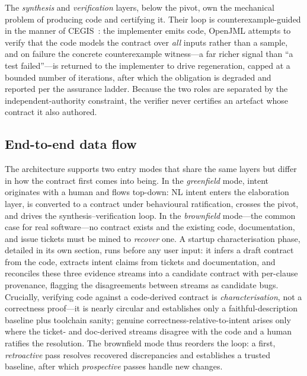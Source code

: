 The \emph{synthesis} and \emph{verification} layers, below the pivot, own the mechanical problem of producing code and certifying it. Their loop is counterexample-guided in the manner of CEGIS~\cite{solarlezama2008sketching}: the implementer emits code, OpenJML attempts to verify that the code models the contract over \emph{all} inputs rather than a sample, and on failure the concrete counterexample witness---a far richer signal than ``a test failed''---is returned to the implementer to drive regeneration, capped at a bounded number of iterations, after which the obligation is degraded and reported per the assurance ladder. Because the two roles are separated by the independent-authority constraint, the verifier never certifies an artefact whose contract it also authored.

\subsection{End-to-end data flow}
\label{subsec:dataflow}

The architecture supports two entry modes that share the same layers but differ in how the contract first comes into being. In the \emph{greenfield} mode, intent originates with a human and flows top-down: NL intent enters the elaboration layer, is converted to a contract under behavioural ratification, crosses the pivot, and drives the synthesis--verification loop. In the \emph{brownfield} mode---the common case for real software---no contract exists and the existing code, documentation, and issue tickets must be mined to \emph{recover} one. A startup characterisation phase, detailed in its own section, runs before any user input: it infers a draft contract from the code, extracts intent claims from tickets and documentation, and reconciles these three evidence streams into a candidate contract with per-clause provenance, flagging the disagreements between streams as candidate bugs. Crucially, verifying code against a code-derived contract is \emph{characterisation}, not a correctness proof---it is nearly circular and establishes only a faithful-description baseline plus toolchain sanity; genuine correctness-relative-to-intent arises only where the ticket- and doc-derived streams disagree with the code and a human ratifies the resolution. The brownfield mode thus reorders the loop: a first, \emph{retroactive} pass resolves recovered discrepancies and establishes a trusted baseline, after which \emph{prospective} passes handle new changes.


